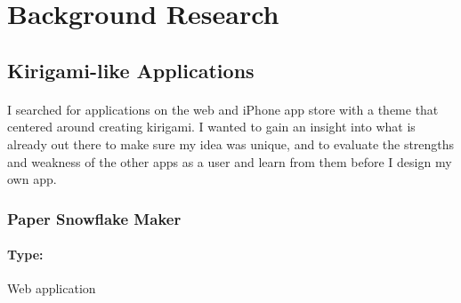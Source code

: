 \documentclass[11pt]{article}
\begin{document}
\newpage
\section{Background Research}

        \subsection{Kirigami-like Applications}
           \paragraph{}
            I searched for applications on the web and iPhone app store with a theme that centered around creating kirigami. I wanted to gain an insight into what is already out there to make sure my idea was unique, and to evaluate the strengths and weakness of the other apps as a user and learn from them before I design my own app. 
        
            \subsubsection{Paper Snowflake Maker}
            
                \paragraph{Type:} Web application %
                
\end{document}
